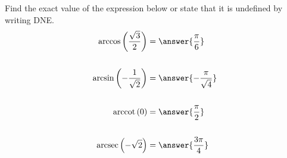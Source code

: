\documentclass{ximera}
\author{Bobby Ramsey}
\begin{document}
\begin{exercise}


Find the exact value of the expression below or state that it is undefined by writing DNE.
\begin{align*}
	\arccos\left( \frac{\sqrt{3}}{2} \right) &= \answer{\frac{\pi}{6}} \\ \\
	\arcsin\left( -\frac{1}{\sqrt{2}} \right) &= \answer{ -\frac{\pi}{\sqrt{4}} } \\ \\
	\arccot\left( 0 \right)&=\answer{ \frac{\pi}{2 } } \\ \\
	\arcsec\left( -\sqrt{2} \right) &= \answer{ \frac{3\pi}{4} } 
\end{align*}


\end{exercise}
\end{document}
